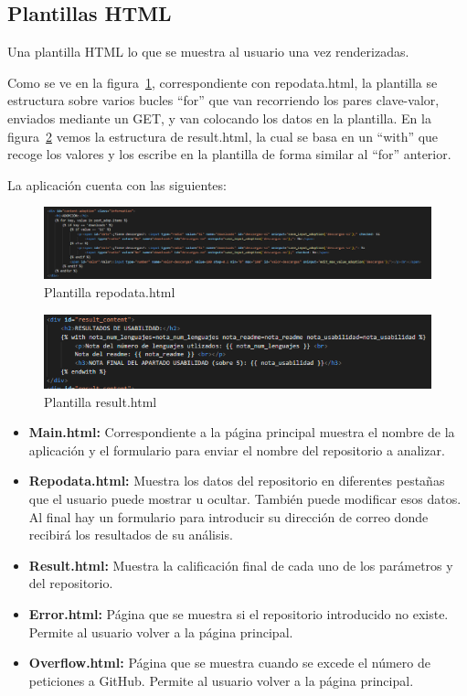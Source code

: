 \documentclass[a4paper, 12pt]{book}
\begin{document}
\subsection{Plantillas HTML}
Una plantilla HTML lo que se muestra al usuario una vez renderizadas.

Como se ve en la figura~\ref{fig:Plantilla1}, correspondiente con repo\textunderscore data.html, la plantilla se estructura sobre varios bucles ``for'' que van recorriendo los pares clave-valor, enviados mediante un GET, y van colocando los datos en la plantilla. En la figura~\ref{fig:Plantilla2} vemos la estructura de result.html, la cual se basa en un ``with'' que recoge los valores y los escribe en la plantilla de forma similar al ``for'' anterior.

La aplicación cuenta con las siguientes:

\begin{figure}
    \centering
    \includegraphics[width=1.15\textwidth, keepaspectratio]{img/plantilla_repo_data.png}
    \caption{Plantilla repo\textunderscore data.html}\label{fig:Plantilla1}
\end{figure}

\begin{figure}
    \centering
    \includegraphics[width=1.15\textwidth, keepaspectratio]{img/plantilla_result.png}
    \caption{Plantilla result.html}\label{fig:Plantilla2}
\end{figure}

\begin{itemize}
	\item \textbf{Main.html:} Correspondiente a la página principal muestra el nombre de la aplicación y el formulario para enviar el nombre del repositorio a analizar.
	\item \textbf{Repo\textunderscore data.html:} Muestra los datos del repositorio en diferentes pestañas que el usuario puede mostrar u ocultar. También puede modificar esos datos. Al final hay un formulario para introducir su dirección de correo donde recibirá los resultados de su análisis.
	\item \textbf{Result.html:} Muestra la calificación final de cada uno de los parámetros y del repositorio.
	\item \textbf{Error.html:} Página que se muestra si el repositorio introducido no existe. Permite al usuario volver a la página principal.
	\item \textbf{Overflow.html:} Página que se muestra cuando se excede el número de peticiones a GitHub. Permite al usuario volver a la página principal.
\end{itemize}
\end{document}
